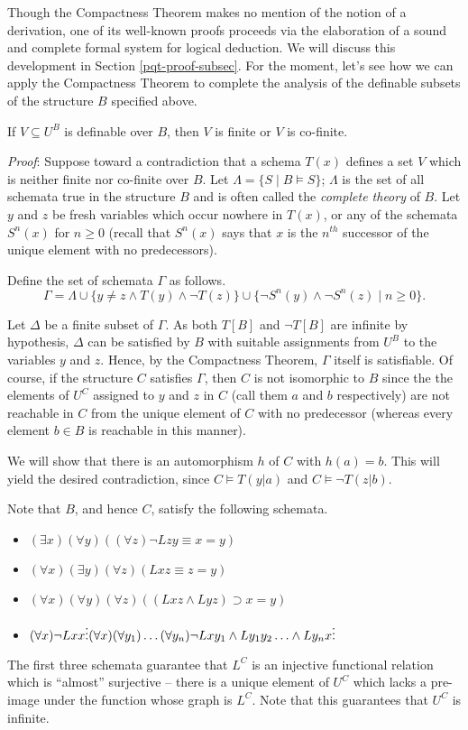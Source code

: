 Though the Compactness Theorem makes no mention of the notion of a derivation, one of its well-known proofs proceeds via the elaboration of a sound and complete formal system for logical deduction. We will discuss this development in Section \ref{pqt-proof-subsec}. For the moment, let's see how we can apply the Compactness Theorem to complete the analysis of the definable subsets of the structure $B$ specified above.
\begin{theorem}
If $V\subseteq U^B$ is definable over $B$, then $V$ is finite or $V$ is co-finite.
\end{theorem}
\emph{Proof}:
Suppose toward a contradiction that a schema $T(x)$ defines a set $V$ which is neither finite nor co-finite over $B$. Let $\Lambda = \{ S\mid B\models S\}$; $\Lambda$ is the set of all schemata true in the structure $B$ and is often called the \emph{complete theory} of $B$. Let $y$ and $z$ be fresh variables which occur nowhere in $T(x)$, or any of the schemata $S^n(x)$ for $n\geq 0$ (recall that $S^n(x)$ says that $x$ is the $n^{th}$ successor of the unique element with no predecessors). 

Define the set of schemata $\Gamma$ as follows.
\[
\Gamma = \Lambda\cup\{y\neq z \land T(y) \land \neg T(z)\}\cup\{\neg S^n(y) \land \neg S^n(z)\mid n\geq 0\}.
\]

Let $\Delta$ be a finite subset of $\Gamma$. As both $T[B]$ and $\neg T[B]$ are infinite by hypothesis, $\Delta$ can be satisfied by $B$ with suitable assignments from $U^B$ to the variables $y$ and $z$. Hence, by the Compactness Theorem, $\Gamma$ itself is satisfiable. Of course, if the structure $C$ satisfies $\Gamma$, then $C$ is not isomorphic to $B$ since the the elements of $U^C$ assigned to $y$ and $z$ in $C$ (call them $a$ and $b$ respectively) are not reachable in $C$ from the unique element of $C$ with no predecessor (whereas every element $b \in B$ is reachable in this manner). 

We will show that there is an automorphism $h$ of $C$ with $h(a)=b$. This will yield the desired  contradiction, since $C\models T(y|a)$ and $C\models \neg T(z|b)$. 

Note that $B$, and hence $C$, satisfy the following schemata.
\begin{itemize}
\item
$(\exists x)(\forall y)((\forall z)\neg Lzy \equiv x=y)$
\item
$(\forall x)(\exists y)(\forall z)(Lxz\equiv z=y)$
\item
$(\forall x)(\forall y)(\forall z)((Lxz\wedge Lyz)\supset x=y)$
\item
$(\forall x)\neg Lxx\\
\vdots\\
(\forall x)(\forall y_1)\ldots(\forall y_n)\neg Lxy_1\wedge Ly_1y_2\ldots\wedge Ly_nx\\
\vdots$
\end{itemize} 
The first three schemata guarantee that $L^C$ is an injective functional relation which is ``almost'' surjective -- there is a unique element of $U^C$ which lacks a pre-image under the function whose graph is $L^C$. Note that this guarantees that $U^C$ is infinite. 

